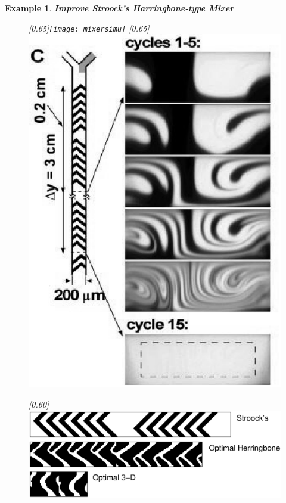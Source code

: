 \documentclass[dvips,landscape]{foils}
\newtheorem{example}{Example}
\begin{document}
\begin{example}{\bfseries Improve Stroock's Harringbone-type Mixer}
\newpage
  \begin{figure}
    \centerline{
       \scalebox{0.65}[0.65]{\texttt{[image: mixersimu]}}
       \scalebox{0.65}[0.65]{\includegraphics{stroockcrosssection0}}
    }
  \end{figure}
\vspace{-0.5cm}
\begin{figure}  
       \scalebox{0.60}[0.60]{\includegraphics[trim=-2cm 0cm 0cm 0cm,clip]{example2fullcycle}}
\end{figure}  


\end{example}
\end{document}
